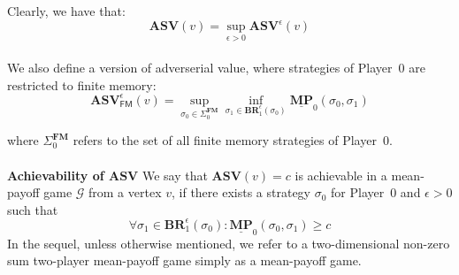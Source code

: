 Clearly, we have that:
\begin{equation*}
    \mathbf{ASV}(v) = \sup\limits_{\epsilon > 0} \mathbf{ASV}^{\epsilon}(v)
\end{equation*}
\\

We also define a version of adverserial value, where strategies of Player~0 are restricted to finite memory:
\begin{equation*}
\mathbf{ASV}^{\epsilon}_\mathsf{FM}(v) = \sup\limits_{\sigma_0 \in \Sigma_0^{\mathbf{FM}}} \inf\limits_{\sigma_1 \in \mathbf{BR}^{\epsilon}_1(\sigma_0)} \underline{\mathbf{MP}}_0(\sigma_0, \sigma_1)
\end{equation*}

where $\Sigma_0^{\mathbf{FM}}$ refers to the set of all finite memory strategies of Player~0.
\\
\\
\noindent\textbf{Achievability of $\mathbf{ASV}$} We say that $\mathbf{ASV}(v) = c$ is achievable in a mean-payoff game $\mathcal{G}$ from a vertex $v$, if there exists a strategy $\sigma_0$ for Player~0 and $\epsilon > 0$ such that
\begin{equation*}
	\forall \sigma_1 \in \mathbf{BR}^{\epsilon}_{1}(\sigma_0) : \underline{\mathbf{MP}}_0(\sigma_0, \sigma_1) \geqslant c
\end{equation*}
In the sequel, unless otherwise mentioned, we refer to a two-dimensional non-zero sum two-player mean-payoff game simply as a mean-payoff game.